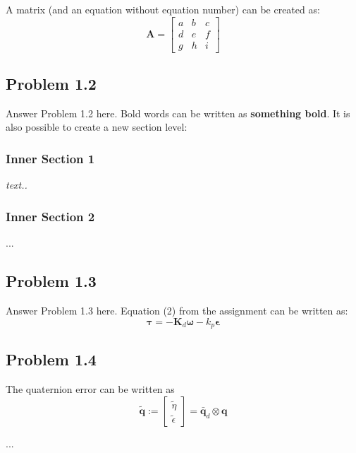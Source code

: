 A matrix (and an equation without equation number) can be created as: 
\begin{equation*}	%
	\mathbf{A} = 
	\begin{bmatrix}
		a & b & c \\ d & e & f \\ g & h & i
	\end{bmatrix}
\end{equation*}

\subsection*{Problem 1.2}
Answer Problem 1.2 here. Bold words can be written as \textbf{something bold}. It is also possible to create a new section level:
\subsubsection*{Inner Section 1}
\emph{text..}

\subsubsection*{Inner Section 2}
...

\subsection*{Problem 1.3}
Answer Problem 1.3 here. Equation (2) from the assignment can be written as: 
\begin{equation}
  \label{eq:tau}
  \mathbf{\tau} = -\mathbf{K}_d \boldsymbol{\omega} - k_p \boldsymbol{\epsilon}
\end{equation}

\subsection*{Problem 1.4}
The quaternion error can be written as
 \begin{equation}
	 \tilde{\mathbf{q}} := \left[
	 \begin{array}{c}
		 \tilde{\eta} \\
		 \tilde{\epsilon}
	 \end{array}
	 \right] = \bar{\mathbf{q}}_d \otimes \mathbf{q} 
	 \label{eq:q_tilde}
 \end{equation} 

...


